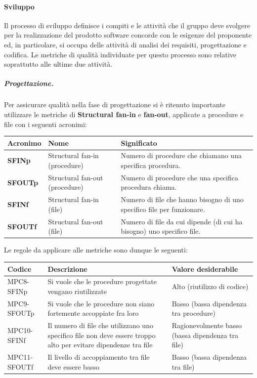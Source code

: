 \paragraph{Sviluppo}
Il processo di sviluppo definisce i compiti e le attività che il gruppo deve svolgere per la
realizzazione del prodotto software concorde con le esigenze del proponente ed, in particolare, si occupa delle attività di analisi dei requisiti, progettazione e codifica. Le metriche di qualità individuate per questo processo sono relative soprattutto alle ultime due attività.
\subparagraph{Progettazione.} Per assicurare qualità nella fase di progettazione si è ritenuto importante utilizzare le metriche di \textbf{Structural fan-in} e \textbf{fan-out}, applicate a procedure e file con i seguenti acronimi:
\begin{table}[h!]
\centering
\def\arraystretch{1.5}
\begin{tabular}{ |m{2cm}|m{4cm}|m{8cm}| }
\hline
\rowcolor{lightgray!30}
\textbf{Acronimo} & \textbf{Nome} & \textbf{Significato}\\
\hline
\textbf{SFINp} & Structural fan-in (procedure) & Numero di procedure che chiamano una specifica procedura.\\
\hline
\textbf{SFOUTp} & Structural fan-out (procedure) & Numero di procedure che una specifica procedura chiama.\\
\hline
\textbf{SFINf} & Structural fan-in (file) & Numero di file che hanno bisogno di uno specifico file per funzionare.\\
\hline
\textbf{SFOUTf} & Structural fan-out (file) & Numero di file da cui dipende (di cui ha bisogno) uno specifico file. \\
\hline
\end{tabular}
\end{table}

\newpage
Le regole da applicare alle metriche sono dunque le seguenti:
\begin{table}[h!]
\centering
\def\arraystretch{1.5}
\begin{tabular}{ |>{\centering\arraybackslash}m{4cm}|>{\centering\arraybackslash}m{5.5cm}|>{\centering\arraybackslash}m{5cm}| }
\hline
\rowcolor{black}
\textbf{\color{white} Codice} & \textbf{\color{white} Descrizione} & \textbf{\color{white} Valore desiderabile}\\
\hline
MPC8-SFINp & Si vuole che le procedure progettate vengano riutilizzate & Alto (riutilizzo di codice) \\
\hline
MPC9-SFOUTp & Si vuole che le procedure non siano fortemente accoppiate fra loro & Basso (bassa dipendenza tra procedure) \\
\hline
MPC10-SFINf & Il numero di file che utilizzano uno specifico file non deve essere troppo alto per evitare dipendenze tra file & Ragionevolmente basso (bassa dipendenza tra file) \\
\hline
MPC11-SFOUTf & Il livello di accoppiamento tra file deve essere basso & Basso (bassa dipendenza tra file) \\
\hline
\end{tabular}
\end{table}

